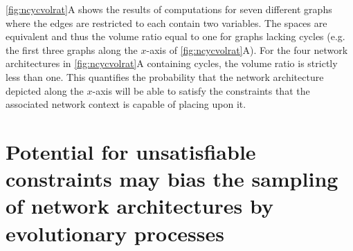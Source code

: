 \ref{fig:ncycvolrat}A shows the results of computations for seven different graphs where the edges are restricted to each contain two variables. The spaces are equivalent and thus the volume ratio equal to one for graphs lacking cycles (e.g. the first three graphs along the $x$-axis of \ref{fig:ncycvolrat}A). For the four network architectures in \ref{fig:ncycvolrat}A containing cycles, the volume ratio is strictly less than one. This quantifies the probability that the network architecture depicted along the $x$-axis will be able to satisfy the constraints that the associated network context is capable of placing upon it.

\section{Potential for unsatisfiable constraints may bias the sampling of network architectures by evolutionary processes}\label{sec:unsatisfiableconstrevolution}


